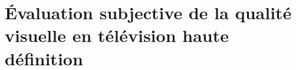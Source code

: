 \documentclass[a4paper,frenchb,pdftex,11pt,twoside,openright]{book} %
\let\origdoublepage\cleardoublepage
\newcommand{\clearemptydoublepage}{%
  \clearpage
  {\pagestyle{empty}\origdoublepage}%
}
\let\cleardoublepage\clearemptydoublepage
\begin{document}
\part[Évaluation subjective de la qualité visuelle \texorpdfstring{\\}{}en télévision haute définition]{Évaluation subjective de la qualité visuelle en télévision haute définition}
% 
% 
% 
% 
%
% 
% 
% 
% 
%
% 
%
%
%
%
% 
% 
%
%
%
\backmatter


\nocite{*}




% 


% 
\end{document}
